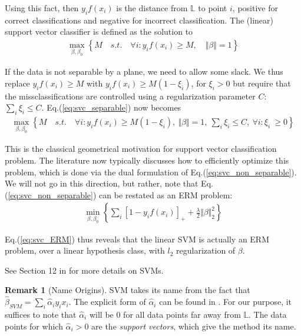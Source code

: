 \documentclass[12pt,a4paper]{article}
\theoremstyle{plain}
\theoremstyle{definition}
\newtheorem{remark}{Remark}
\newcommand{\norm}[1]{\Vert #1 \Vert}
\newcommand{\hyp}{f}
\newcommand{\plane}{\mathbb{L}}
\newcommand{\positive}[1]{\left[ #1 \right]_+}
\begin{document}
Using this fact, then $y_i \hyp(x_i)$ is the distance from $\plane$ to point $i$, positive for correct classifications and negative for incorrect classification. 
The (linear) support vector classifier is defined as the solution to
\begin{align}
\label{eq:svc_separable}
	\max_{\beta,\beta_0} \left\{ 
		M \quad s.t. \quad 
		\forall i: y_i \hyp(x_i) \geq M, \quad \norm{\beta}=1
	\right\}
\end{align}

If the data is not separable by a plane, we need to allow some slack.
We thus replace $y_i \hyp(x_i) \geq M$ with $y_i \hyp(x_i) \geq M(1-\xi_i)$, for $\xi_i>0$ but require that the missclassifications are controlled using a regularization parameter $C$: $\sum_i \xi_i \leq C$.
Eq.(\ref{eq:svc_separable}) now becomes \citep[Eq.(12.25)]{hastie_elements_2003}
\begin{align}
\label{eq:svc_non_separable}
	\max_{\beta,\beta_0} \left\{ 
		M \quad s.t. \quad 
		\forall i: y_i \hyp(x_i) \geq M(1-\xi_i), 
		\: \norm{\beta}=1, 
		\: \sum_i \xi_i \leq C,
		\:\forall i:\xi_i\ \geq 0
	\right\}
\end{align}

This is the classical geometrical motivation for support vector classification problem.
The literature now typically discusses how to efficiently optimize this problem, which is done via the dual formulation of Eq.(\ref{eq:svc_non_separable}).
We will not go in this direction, but rather, note that Eq.(\ref{eq:svc_non_separable}) can be restated as an ERM problem:
\begin{align}
\label{eq:svc_ERM}
	\min_{\beta,\beta_0} \left\{
		\sum_i \positive{1-y_i \hyp(x_i)} +\frac{\lambda}{2} \norm{\beta}_2^2
	\right\}
\end{align}

Eq.(\ref{eq:svc_ERM}) thus reveals that the linear SVM is actually an ERM problem, over a linear hypothesis class, with $l_2$ regularization of $\beta$.

See Section 12 in \cite{hastie_elements_2003} for more details on SVMs.


\begin{remark}[Name Origins]
SVM takes its name from the fact that $\hat{\beta}_{SVM}=\sum_i \hat{\alpha}_i y_i x_i$.
The explicit form of $\hat{\alpha}_i$ can be found in \citep[Section 12.2.1]{hastie_elements_2003}.
For our purpose, it suffices to note that $\hat{\alpha}_i$ will be $0$ for all data points far away from $\plane$.
The data points for which $\hat{\alpha}_i>0$ are the \emph{support vectors}, which give the method its name.
\end{remark}
\end{document}
